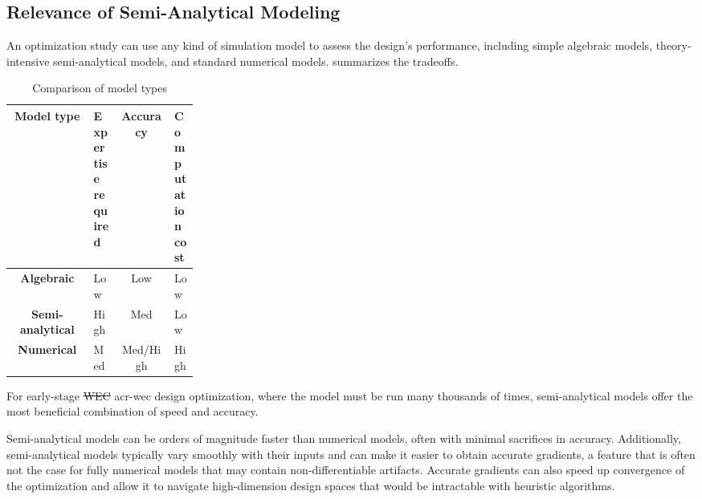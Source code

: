 \documentclass[a4paper,fleqn,colorlinks,unicode,lineno]{cas-dc} %
\makeatletter
\providecommand{\DIFdeltex}[1]{{\protect\color{red}\sout{#1}}} %
\providecommand{\DIFaddbegin}{} %
\providecommand{\DIFaddend}{} %
\providecommand{\DIFdelbegin}{} %
\providecommand{\DIFdelend}{} %
\providecommand{\DIFdel}[1]{\texorpdfstring{\DIFdeltex{#1}}{}} %
\providecommand{\DIFscaledelfig}{0.5}
\newlength{\DIFdelgraphicswidth} %
\newlength{\DIFdelgraphicsheight} %
\providecommand{\DIFaddincludegraphics}[2][]{{\color{blue}\fbox{\DIFOincludegraphics[#1]{#2}}}} %
\providecommand{\DIFdelincludegraphics}[2][]{%
\sbox{\DIFdelgraphicsbox}{\DIFOincludegraphics[#1]{#2}}%
\settoboxwidth{\DIFdelgraphicswidth}{\DIFdelgraphicsbox} %
\settoboxtotalheight{\DIFdelgraphicsheight}{\DIFdelgraphicsbox} %
\scalebox{\DIFscaledelfig}{%
\parbox[b]{\DIFdelgraphicswidth}{\usebox{\DIFdelgraphicsbox}\\[-\baselineskip] \rule{\DIFdelgraphicswidth}{0em}}\llap{\resizebox{\DIFdelgraphicswidth}{\DIFdelgraphicsheight}{%
\setlength{\unitlength}{\DIFdelgraphicswidth}%
\begin{picture}(1,1)%
\thicklines\linethickness{2pt} %
{\color[rgb]{1,0,0}\put(0,0){\framebox(1,1){}}}%
{\color[rgb]{1,0,0}\put(0,0){\line( 1,1){1}}}%
{\color[rgb]{1,0,0}\put(0,1){\line(1,-1){1}}}%
\end{picture}%
}\hspace*{3pt}}} %
} %
\DeclareRobustCommand{\DIFaddbegin}{\DIFOaddbegin \let\includegraphics\DIFaddincludegraphics} %
\DeclareRobustCommand{\DIFaddend}{\DIFOaddend \let\includegraphics\DIFOincludegraphics} %
\DeclareRobustCommand{\DIFdelbegin}{\DIFOdelbegin \let\includegraphics\DIFdelincludegraphics} %
\DeclareRobustCommand{\DIFdelend}{\DIFOaddend \let\includegraphics\DIFOincludegraphics} %
\let\sout@orig\sout %
\renewcommand{\sout}[1]{\ifmmode\text{\sout@orig{\ensuremath{#1}}}\else\sout@orig{#1}\fi} %
\makeatother
\begin{document}
\subsection{Relevance of Semi-Analytical Modeling}   
An optimization study can use any kind of simulation model to assess the design's performance, including simple algebraic models, theory-intensive semi-analytical models, and standard numerical models.
 summarizes the tradeoffs.

\begin{table}[htbp]
    \centering
    \caption{Comparison of model types}
    \label{tab:model-types}
\begin{tabular}{cM{0.14\linewidth}cM{0.13\linewidth}}
         \textbf{Model type}&  \textbf{Expertise required}&  \textbf{Accuracy}&  \textbf{Computation cost}\\ \hline
         \textbf{Algebraic}&  Low&  Low&  Low\\
         \textbf{Semi-analytical}&  High&  Med&  Low\\
         \textbf{Numerical}&  Med&  Med/High&  High\\
    \end{tabular}
    \end{table}

For early-stage \DIFdelbegin \DIFdel{WEC }\DIFdelend \DIFaddbegin \gls{acr-wec} \DIFaddend design optimization, where the model must be run many thousands of times, semi-analytical models offer the most beneficial combination of speed and accuracy.

\ifdefined\DISSERTATION
    Semi-analytical models can be orders of magnitude faster than numerical models, often with minimal sacrifices in accuracy.
    Additionally, semi-analytical models typically vary smoothly with their inputs and can make it easier to obtain accurate gradients, a feature that is often not the case for fully numerical models that may contain non-differentiable artifacts.
    Accurate gradients can also speed up convergence of the optimization and allow it to navigate high-dimension design spaces that would be intractable with heuristic algorithms.
\end{document}

